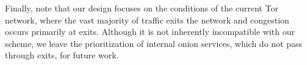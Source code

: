 Finally, note that our design focuses on the conditions of the current Tor network, where the vast majority of traffic exits the network and congestion occurs primarily at exits.
Although it is not inherently incompatible with our scheme, we leave the prioritization of internal onion services, which do not pass through exits, for future work.

